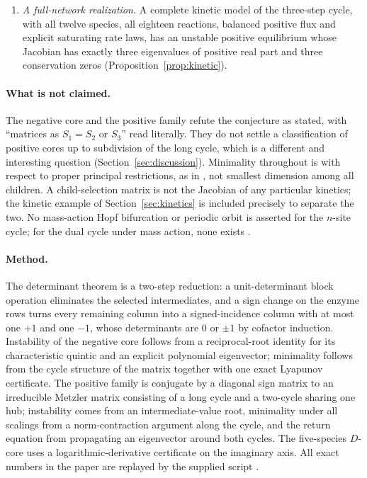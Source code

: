 \documentclass[11pt,a4paper]{article}
\theoremstyle{plain}
\theoremstyle{definition}
\theoremstyle{remark}
\begin{document}
\begin{enumerate}[label=(\alph*)]
\item \emph{A full-network realization.} A complete kinetic model of the three-step cycle, with all twelve species, all eighteen reactions, balanced positive flux and explicit saturating rate laws, has an unstable positive equilibrium whose Jacobian has exactly three eigenvalues of positive real part and three conservation zeros (Proposition~\ref{prop:kinetic}).
\end{enumerate}

\paragraph{What is not claimed.}
The negative core and the positive family refute the conjecture as stated, with ``matrices as $S_1=S_2$ or $S_3$'' read literally. They do not settle a classification of positive cores up to subdivision of the long cycle, which is a different and interesting question (Section~\ref{sec:discussion}). Minimality throughout is with respect to proper principal restrictions, as in \citep{VassenaStadler2024}, not smallest dimension among all children. A child-selection matrix is not the Jacobian of any particular kinetics; the kinetic example of Section~\ref{sec:kinetics} is included precisely to separate the two. No mass-action Hopf bifurcation or periodic orbit is asserted for the $n$-site cycle; for the dual cycle under mass action, none exists \citep{Vassena2026}.

\paragraph{Method.}
The determinant theorem is a two-step reduction: a unit-determinant block operation eliminates the selected intermediates, and a sign change on the enzyme rows turns every remaining column into a signed-incidence column with at most one $+1$ and one $-1$, whose determinants are $0$ or $\pm1$ by cofactor induction. Instability of the negative core follows from a reciprocal-root identity for its characteristic quintic and an explicit polynomial eigenvector; minimality follows from the cycle structure of the matrix together with one exact Lyapunov certificate. The positive family is conjugate by a diagonal sign matrix to an irreducible Metzler matrix consisting of a long cycle and a two-cycle sharing one hub; instability comes from an intermediate-value root, minimality under all scalings from a norm-contraction argument along the cycle, and the return equation from propagating an eigenvector around both cycles. The five-species $D$-core uses a logarithmic-derivative certificate on the imaginary axis. All exact numbers in the paper are replayed by the supplied script .
\end{document}
